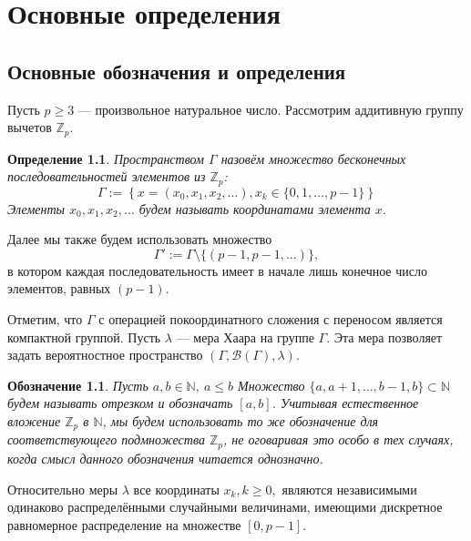 \documentclass[14pt, a4paper, russian]{report}
\newtheorem{definition}{\indent Определение}
\newtheorem*{notation}{\indent Обозначение}
\begin{document}
\newpage

\chapter{Основные определения}

\section{Основные обозначения и определения}

Пусть $p \ge 3$ --- произвольное натуральное число. Рассмотрим аддитивную группу вычетов $\mathbb{Z}_p$. 

\begin{definition}
Пространством $\Gamma$ назовём множество бесконечных последовательностей элементов из $\mathbb{Z}_p$:
$$\Gamma := \left\{x = \left(x_0, x_1, x_2, \ldots \right), x_k \in \{0, 1, \ldots, p - 1\} \right\}$$
Элементы $x_0, x_1, x_2, \ldots$ будем называть координатами элемента $x$.
\end{definition}
Далее мы также будем использовать множество 
$$\Gamma' := \Gamma \setminus \{(p-1,p-1,\ldots)\},$$
в котором каждая последовательность имеет в начале лишь конечное число элементов, равных $(p-1)$.

Отметим, что $\Gamma$ с операцией покоординатного сложения с переносом является компактной группой. Пусть $\lambda$ --- мера Хаара на группе $\Gamma$. Эта мера позволяет задать вероятностное пространство $(\Gamma, \mathcal{B}(\Gamma), \lambda)$.

\begin{notation} 
Пусть $a, b \in \mathbb{N},\ a \le b$ Множество $\{a, a+1, \ldots, b-1, b\} \subset \mathbb{N}$ будем называть отрезком и обозначать $\left[a, b\right]$. Учитывая естественное вложение $\mathbb{Z}_p$ в $\mathbb{N}$, мы будем использовать то же обозначение для соответствующего подмножества $\mathbb{Z}_p$, не оговаривая это особо в тех случаях, когда смысл данного обозначения читается однозначно.
\end{notation}

Относительно меры $\lambda$ все координаты $x_k, k \ge 0,$ являются независимыми одинаково распределёнными случайными величинами, имеющими дискретное равномерное распределение на множестве $\left[0, p-1\right]$. 
\end{document}
